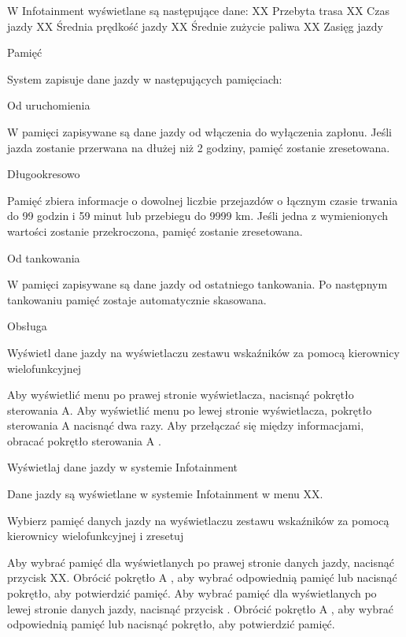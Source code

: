 W Infotainment wyświetlane są następujące dane:
XX Przebyta trasa
XX Czas jazdy
XX Średnia prędkość jazdy
XX Średnie zużycie paliwa
XX Zasięg jazdy

Pamięć

System zapisuje dane jazdy w następujących pamięciach:

Od uruchomienia
\begin{itemizeTriangle}
	\itemTriangle W pamięci zapisywane są dane jazdy od włączenia do wyłączenia zapłonu. Jeśli jazda zostanie przerwana na dłużej niż 2 godziny, pamięć zostanie zresetowana.
\end{itemizeTriangle}

Długookresowo
\begin{itemizeTriangle}
	\itemTriangle Pamięć zbiera informacje o dowolnej liczbie przejazdów o łącznym czasie trwania do 99 godzin i 59 minut lub przebiegu do 9999 km. Jeśli jedna z wymienionych wartości zostanie przekroczona, pamięć zostanie zresetowana.
\end{itemizeTriangle}

Od tankowania
\begin{itemizeTriangle}
	\itemTriangle W pamięci zapisywane są dane jazdy od ostatniego tankowania. Po następnym tankowaniu pamięć zostaje automatycznie skasowana.
\end{itemizeTriangle}


Obsługa

Wyświetl dane jazdy na wyświetlaczu zestawu wskaźników za pomocą kierownicy wielofunkcyjnej
\begin{itemizeArrow}
	\itemArrow Aby wyświetlić menu po prawej stronie wyświetlacza, nacisnąć pokrętło sterowania A.
	\itemArrow Aby wyświetlić menu po lewej stronie wyświetlacza, pokrętło sterowania A nacisnąć dwa razy.
	\itemArrow Aby przełączać się między informacjami, obracać pokrętło sterowania A .
\end{itemizeArrow}

Wyświetlaj dane jazdy w systemie Infotainment

Dane jazdy są wyświetlane w systemie Infotainment w menu XX.

Wybierz pamięć danych jazdy na wyświetlaczu zestawu wskaźników za pomocą kierownicy wielofunkcyjnej i zresetuj
\begin{itemizeArrow}
	\itemArrow Aby wybrać pamięć dla wyświetlanych po prawej stronie danych jazdy, nacisnąć przycisk XX. Obrócić pokrętło A , aby wybrać odpowiednią pamięć lub nacisnąć pokrętło, aby potwierdzić pamięć.
	\itemArrow Aby wybrać pamięć dla wyświetlanych po lewej stronie danych jazdy, nacisnąć przycisk . Obrócić pokrętło A , aby wybrać odpowiednią pamięć lub nacisnąć pokrętło, aby potwierdzić pamięć.
\end{itemizeArrow}

